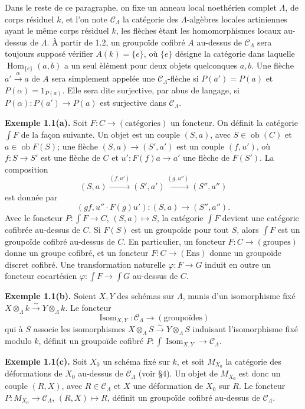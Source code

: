 \documentclass[11pt]{article}
\providecommand{\Isom}{\operatorname{Isom}}
\providecommand{\Hom}{\operatorname{Hom}}
\providecommand{\ob}{\operatorname{ob}}
\providecommand{\Ens}{\mathrm{Ens}}
\providecommand{\CL}{\mathcal C_\Lambda}
\providecommand{\Isom}{\operatorname{Isom}}
\begin{document}
Dans le reste de ce paragraphe, on fixe un anneau local noeth\'erien complet $\Lambda$, de corps r\'esiduel $k$, et l'on note $\CL$ la cat\'egorie des $\Lambda$-alg\`ebres locales artiniennes ayant le m\^eme corps r\'esiduel $k$, les fl\`eches \`etant les homomorphismes locaux au-dessus de $\Lambda$. \`A partir de 1.2, un groupo\"ide cofibr\'e $A$ au-dessus de $\CL$ sera toujours suppos\'e v\'erifier $A(k)=\{e\}$, o\`u $\{e\}$ d\'esigne la cat\'egorie dans laquelle $\Hom_{\{e\}}(a,b)$ a un seul \`el\'ement pour deux objets quelconques $a,b$. Une fl\`eche $a'\xrightarrow{\alpha}a$ de $A$ sera simplement appel\'ee une $\CL$-fl\`eche si $P(a')=P(a)$ et $P(\alpha)=1_{P(a)}$. Elle sera dite surjective, par abus de langage, si $P(\alpha):P(a')\to P(a)$ est surjective dans $\CL$.

\textbf{Exemple 1.1(a).} Soit $F:C\to(\text{cat\'egories})$ un foncteur. On d\'efinit la cat\'egorie $\int F$ de la fa\c con suivante. Un objet est un couple $(S,a)$, avec $S\in\ob(C)$ et $a\in\ob F(S)$; une fl\`eche $(S,a)\to(S',a')$ est un couple $(f,u')$, o\`u $f:S\to S'$ est une fl\`eche de $C$ et $u':F(f)a\to a'$ une fl\`eche de $F(S')$. La composition
\[
 (S,a)\xrightarrow{(f,u')}(S',a')\xrightarrow{(g,u'')}(S'',a'')
\]
est donn\'ee par
\[
 (gf,u''\cdot F(g)u'):(S,a)\longrightarrow(S'',a'').
\]
Avec le foncteur $P:\int F\to C$, $(S,a)\mapsto S$, la cat\'egorie $\int F$ devient une cat\'egorie cofibr\'ee au-dessus de $C$. Si $F(S)$ est un groupo\"ide pour tout $S$, alors $\int F$ est un groupo\"ide cofibr\'e au-dessus de $C$. En particulier, un foncteur $F:C\to(\mathrm{groupes})$ donne un groupe cofibr\'e, et un foncteur $F:C\to(\Ens)$ donne un groupo\"ide discret cofibr\'e. Une transformation naturelle $\varphi:F\to G$ induit en outre un foncteur cocart\'esien $\varphi:\int F\to\int G$ au-dessus de $C$.

\textbf{Exemple 1.1(b).} Soient $X,Y$ des sch\'emas sur $\Lambda$, munis d'un isomorphisme fix\'e $X\otimes_\Lambda k\xrightarrow{\sim}Y\otimes_\Lambda k$. Le foncteur
\[
 \Isom_{X,Y}:\CL\longrightarrow(\text{groupo\"ides})
\]
qui \`a $S$ associe les isomorphismes $X\otimes_\Lambda S\xrightarrow{\sim}Y\otimes_\Lambda S$ induisant l'isomorphisme fix\'e modulo $k$, d\'efinit un groupo\"ide cofibr\'e $P:\int\Isom_{X,Y}\to\CL$.

\textbf{Exemple 1.1(c).} Soit $X_0$ un sch\'ema fix\'e sur $k$, et soit $M_{X_0}$ la cat\'egorie des d\'eformations de $X_0$ au-dessus de $\CL$ (voir \S4). Un objet de $M_{X_0}$ est donc un couple $(R,X)$, avec $R\in\CL$ et $X$ une d\'eformation de $X_0$ sur $R$. Le foncteur $P:M_{X_0}\to\CL$, $(R,X)\mapsto R$, d\'efinit un groupo\"ide cofibr\'e au-dessus de $\CL$.
\end{document}
